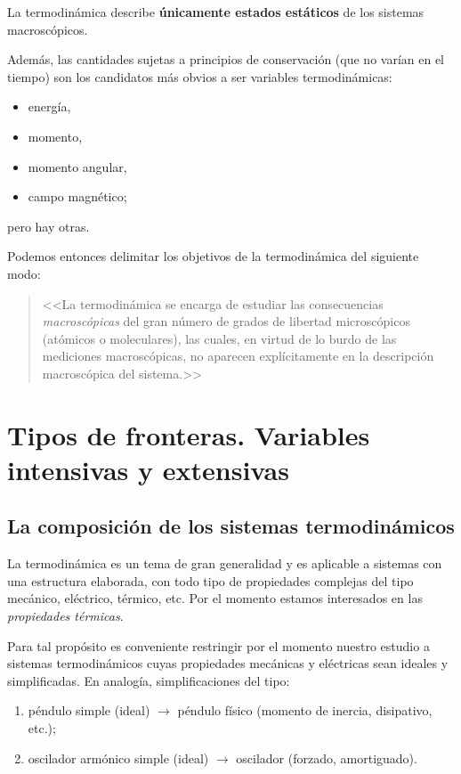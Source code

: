 \begin{definicion}
  La termodinámica describe \textbf{únicamente estados estáticos} de los sistemas macroscópicos.
\end{definicion}

Además, las cantidades sujetas a principios de conservación (que no varían en el tiempo) son los
candidatos más obvios a ser variables termodinámicas:
\begin{itemize}[itemsep=0pt]
  \item energía,
  \item momento,
  \item momento angular,
  \item campo magnético;
\end{itemize}
pero hay otras.

Podemos entonces delimitar los objetivos de la termodinámica del siguiente modo:
\begin{quote}
  <<La termodinámica se encarga de estudiar las consecuencias \emph{macroscópicas} del gran número
  de grados de libertad microscópicos (atómicos o moleculares), las cuales, en virtud de lo burdo
  de las mediciones macroscópicas, no aparecen explícitamente en la descripción macroscópica del
  sistema.>>
\end{quote}

\section{Tipos de fronteras. Variables intensivas y extensivas}

\subsection*{La composición de los sistemas termodinámicos}

La termodinámica es un tema de gran generalidad y es aplicable a sistemas con una estructura
elaborada, con todo tipo de propiedades complejas del tipo mecánico, eléctrico, térmico, etc.
Por el momento estamos interesados en las \emph{propiedades térmicas}.

Para tal propósito es conveniente restringir por el momento nuestro estudio a sistemas
termodinámicos cuyas propiedades mecánicas y eléctricas sean ideales y simplificadas. En
analogía, simplificaciones del tipo:
\begin{enumerate}[label=\alph*),itemsep=0pt]
  \item péndulo simple (ideal) $\to$ péndulo físico (momento de inercia, disipativo, etc.);
  \item oscilador armónico simple (ideal) $\to$ oscilador (forzado, amortiguado).
\end{enumerate}

